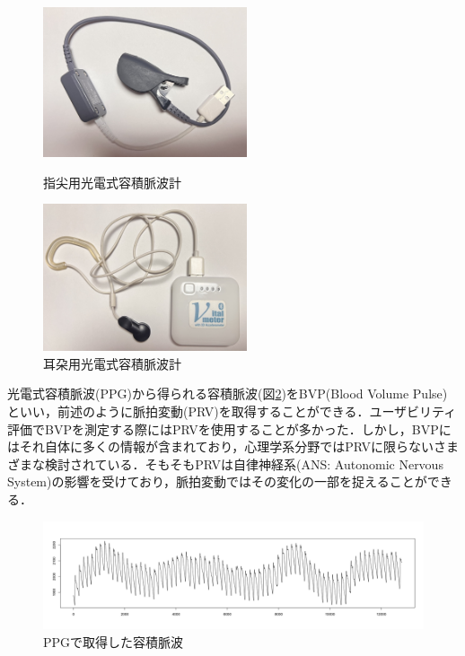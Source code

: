 \begin{figure}[htbp]
\begin{minipage}{0.5\hsize}
    \begin{center}
       \includegraphics[width=60mm]{img/device2.jpg}
    \end{center}
    \caption{指尖用光電式容積脈波計}
    \label{fig:device2}
  \end{minipage}
  \begin{minipage}{0.5\hsize}
    \begin{center}
       \includegraphics[width=60mm]{img/device1.jpg}
    \end{center}
    \caption{耳朶用光電式容積脈波計}
    \label{fig:device1}
  \end{minipage}
\end{figure}

光電式容積脈波(PPG)から得られる容積脈波(図\ref{fig:bvpfukuinone})をBVP(Blood Volume Pulse)といい，前述のように脈拍変動(PRV)を取得することができる．ユーザビリティ評価でBVPを測定する際にはPRVを使用することが多かった．しかし，BVPにはそれ自体に多くの情報が含まれており，心理学系分野ではPRVに限らないさまざまな検討されている．そもそもPRVは自律神経系(ANS: Autonomic Nervous System)の影響を受けており，脈拍変動ではその変化の一部を捉えることができる\cite{peper}．

\begin{figure}[htbp]
    \begin{center}
       \includegraphics[width=\linewidth]{img/bvp_fukui_none.png}
    \end{center}
    \caption{PPGで取得した容積脈波}
    \label{fig:bvpfukuinone}
\end{figure}

